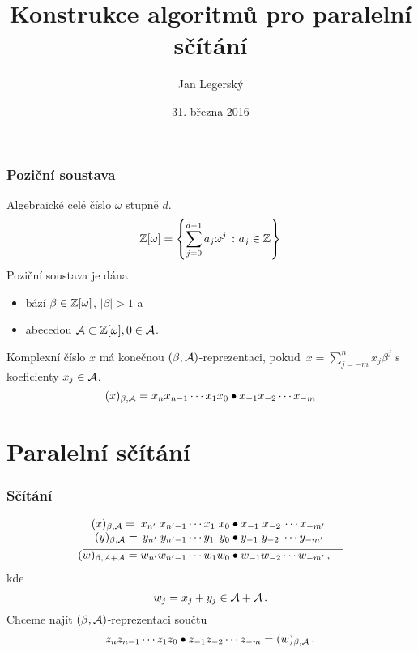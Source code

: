 \documentclass[11pt]{beamer}
\title{Konstrukce algoritmů pro paralelní sčítání}
\institute{TIGR \\
                \url{jan.legersky@gmail.com} \\
					\rule{0cm}{0mm} \\
					\rule{0cm}{0mm}\\
					Školitel: Ing. Štěpán Starosta, PhD. \\
           	\rule{0cm}{0mm} \\
					Předdiplomní seminář}
\author{Jan Legersk\'y}
\date{31. března 2016}
\begin{document}
\begin{frame}
  \titlepage
\end{frame}

\begin{frame}
  \tableofcontents
\end{frame}



\begin{frame}
  \frametitle{Poziční soustava}
  Algebraické celé číslo $\omega$ stupně $d$.
  $$\mathbb{Z}[\omega]= \left\{\sum_{j=0}^{d-1} a_j \omega^j\ \colon  a_j \in \mathbb{Z} \right\}$$
  \pause
  Poziční soustava je dána
  \begin{itemize}
    \item bází $\beta \in \mathbb{Z}[\omega]$, $|\beta|>1$ a
    \item abecedou $\mathcal{A} \subset \mathbb{Z}[\omega] , 0\in \mathcal{A}$. 
  \end{itemize}
  
  \pause
  
  Komplexní číslo $x$ má konečnou  $(\beta, \mathcal{A})$-reprezentaci, pokud~$x=\sum_{j=-m}^n x_j \beta^j$ s koeficienty $x_j\in\mathcal{A}$.
  $$
    (x)_{\beta,\mathcal{A}}=x_n x_{n-1}\cdots x_1 x_0 \bullet x_{-1} x_{-2} \cdots x_{-m}
  $$ 
\end{frame}

\section{Paralelní sčítání}
\begin{frame}
  \frametitle{Sčítání}
    \begin{align*}
  (x)_{\beta,\A}=\;x_{n'} \;x_{{n'}-1}\cdots x_1 \;x_0 &\bullet x_{-1} \;x_{-2}\, \cdots x_{-m'} \\[-3pt]
  (y)_{\beta,\A}=\,y_{n'} \;y_{{n'}-1}\cdots y_1 \,\;y_0 &\bullet y_{-1} \;y_{-2} \;\cdots y_{-m'} \\[-7pt]
    \line(1,0){130} & \line(1,0){100} \\[-7pt]
  (w)_{\beta,\A+\A}=w_{n'} w_{{n'}-1}\cdots w_1 w_0 &\bullet w_{-1} w_{-2} \cdots w_{-m'}\,,
  \end{align*}
  kde
  $$
    w_j=x_j+y_j \in \mathcal{A} +\mathcal{A}\,.
  $$
  \pause
  Chceme najít $(\beta,\mathcal{A})$-reprezentaci součtu
  $$
    z_{n} z_{n-1}\cdots z_1 z_0 \bullet z_{-1} z_{-2} \cdots z_{-m}=(w)_{\beta,\mathcal{A}}\,.
  $$ 
\end{frame}
\end{document}

